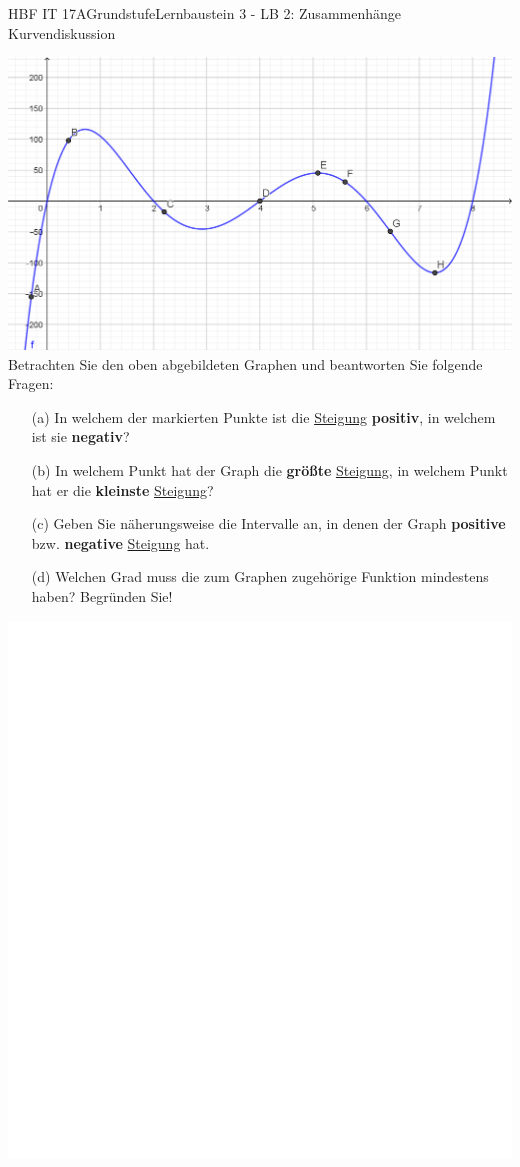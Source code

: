 \documentclass[oneside,openany,headings=optiontotoc,11pt,numbers=noenddot]{scrreprt}
\begin{document}
	\begin{worksheet}{HBF IT 17A}{Grundstufe}{Lernbaustein 3 - LB 2: Zusammenhänge Kurvendiskussion}
		\begin{framed}
			\noindent
			\includegraphics[scale=0.5]{Bilder/fKurv.png}
			Betrachten Sie den oben abgebildeten Graphen und beantworten Sie folgende Fragen:
			\begin{itemize}
				\item[(a)] In welchem der markierten Punkte ist die \underline{Steigung} \textbf{positiv}, in welchem ist sie \textbf{negativ}?
				\item[(b)] In welchem Punkt hat der Graph die \textbf{größte} \underline{Steigung}, in welchem Punkt hat er die \textbf{kleinste} \underline{Steigung}?
				\item[(c)] Geben Sie näherungsweise die Intervalle an, in denen der Graph \textbf{positive} bzw. \textbf{negative} \underline{Steigung} hat.
				\item[(d)] Welchen Grad muss die zum Graphen zugehörige Funktion mindestens haben? Begründen Sie!
			\end{itemize}
			\includegraphics[scale=0.57]{../empty.jpg}

\end{framed}
\end{worksheet}
\end{document}
